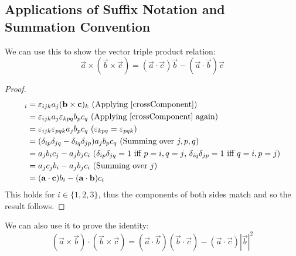 \documentclass[../main.tex]{subfiles}
\begin{document}
\subsection{Applications of Suffix Notation and Summation Convention} \label{suffixApplications}
We can use this to show the vector triple product relation:
\[
  \vec{a} \times (\vec{b} \times \vec{c}) = (\vec{a} \cdot \vec{c})\vec{b} - (\vec{a} \cdot \vec{b})\vec{c}
\]
\begin{proof}
  \begin{align*}
    [\vec{a} \times (\vec{b} \times \vec{c})]_i &= \levi_{ijk} a_j (\vec{b} \times \vec{c})_k \text{ (Applying \cref{crossComponent})} \\
                                                &= \levi_{ijk} a_j \levi_{kpq} b_p c_q \text{ (Applying \cref{crossComponent} again)}\\
                                                &= \levi_{ijk} \levi_{pqk} a_j b_p c_q \text{ ($\levi_{k p q} = \levi_{p q k}$)}\\
                                                &= (\delta_{i p} \delta_{j q} - \delta_{i q} \delta_{j p}) a_j b_p c_q \text{ (Summing over $j, p, q$)} \\
                                                &= a_j b_i c_j - a_j b_j c_i \text{ ($\delta_{i p} \delta_{j q} = 1$ iff $p = i, q = j$, $\delta_{i q}\delta_{j p} = 1$ iff $q = i, p = j$)}\\
                                                &= a_j c_j b_i - a_j b_j c_i \text{ (Summing over $j$)}\\
                                                &= (\vec{a} \cdot \vec{c})b_i - (\vec{a} \cdot \vec{b})c_i
  \end{align*}
  This holds for $i \in \{1, 2, 3\}$, thus the components of both sides match and so the result follows.
\end{proof}
We can also use it to prove the identity:
\begin{equation}
  (\vec{a} \times \vec{b}) \cdot (\vec{b} \times \vec{c}) = (\vec{a} \cdot \vec{b})(\vec{b} \cdot \vec{c}) - (\vec{a} \cdot \vec{c})|\vec{b}|^2 \label{sphericalTrigIdentity}
\end{equation}
\end{document}
